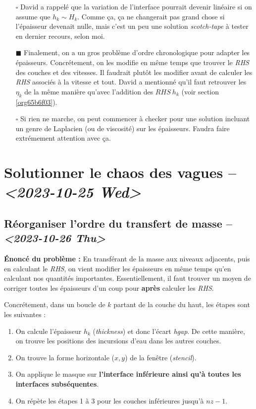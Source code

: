 \documentclass[10pt]{article}
\numberwithin{equation}{section}
\renewcommand{\boxtimes}{\blacksquare}
\begin{document}
\begin{itemize}
\item[{$\square$}] David a rappelé que la variation de l'interface pourrait devenir linéaire si on assume que \(h_k \sim H_k\).
Comme ça, ça ne changerait pas grand chose si l'épaisseur devenait nulle, mais c'est un peu une solution \emph{scotch-tape} à tester en dernier recours, selon moi.\bigskip

\item[{$\boxtimes$}] Finalement, on a un gros problème d'ordre chronologique pour adapter les épaisseurs.
Concrétement, on les modifie en même temps que trouver le \emph{RHS} des couches et des vitesses.
Il faudrait plutôt les modifier avant de calculer les \emph{RHS} associés à la vitesse et tout.
David a mentionné qu'il faut retrouver les \(\eta_k\) de la même manière qu'avec l'addition des \(RHS\ h_k\) (voir section \ref{org65b6f03}). \bigskip

\item[{$\square$}] Si rien ne marche, on peut commencer à checker pour une solution incluant un genre de Laplacien (ou de viscosité) sur les épaisseurs.
Faudra faire extrémement attention avec ça.
\end{itemize}

\section{Solutionner le chaos des vagues -- \textit{<2023-10-25 Wed>}}
\label{sec:org195d421}

\subsection{Réorganiser l'ordre du transfert de masse -- \textit{<2023-10-26 Thu>}}
\label{sec:org59163f0}
\label{org65b6f03}
\textbf{Énoncé du problème :} En transférant de la masse aux niveaux adjacents, puis en calculant le \emph{RHS}, on vient modifier les épaisseurs en même temps qu'en calculant nos quantités importantes.
Essentiellement, il faut trouver un moyen de corriger toutes les épaisseurs d'un coup pour \textbf{après} calculer les \emph{RHS}. \bigskip

Concrétement, dans un boucle de \(k\) partant de la couche du haut, les étapes sont les suivantes :
\begin{enumerate}
\item On calcule l'épaisseur \(h_k\) (\emph{thickness}) et donc l'écart \emph{hgap}.
De cette manière, on trouve les positions des incursions d'eau dans les autres couches.
\item On trouve la forme horizontale (\(x,y\)) de la fenêtre (\emph{stencil}).
\item On applique le masque sur \textbf{l'interface inférieure ainsi qu'à toutes les interfaces subséquentes}.
\item On répète les étapes 1 à 3 pour les couches inférieures jusqu'à \(nz-1\).\bigskip
\end{enumerate}
\end{document}
